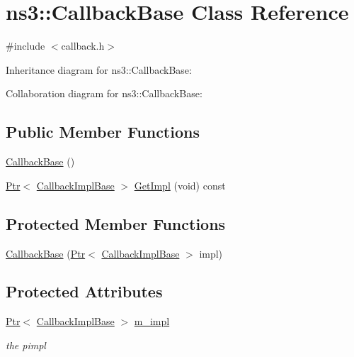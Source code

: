 \hypertarget{classns3_1_1CallbackBase}{}\section{ns3\+:\+:Callback\+Base Class Reference}
\label{classns3_1_1CallbackBase}


{\ttfamily \#include $<$callback.\+h$>$}



Inheritance diagram for ns3\+:\+:Callback\+Base\+:


Collaboration diagram for ns3\+:\+:Callback\+Base\+:
\subsection*{Public Member Functions}
\begin{DoxyCompactItemize}
\item 
\hyperlink{classns3_1_1CallbackBase_a6b56daf07aaf75faeaf954f2d476d9b9}{Callback\+Base} ()
\item 
\hyperlink{classns3_1_1Ptr}{Ptr}$<$ \hyperlink{classns3_1_1CallbackImplBase}{Callback\+Impl\+Base} $>$ \hyperlink{classns3_1_1CallbackBase_a89fd0e6ca954ae0d73382bff2fbfc20b}{Get\+Impl} (void) const 
\end{DoxyCompactItemize}
\subsection*{Protected Member Functions}
\begin{DoxyCompactItemize}
\item 
\hyperlink{classns3_1_1CallbackBase_a15ee9b49bf0815bbbd6101c44b3189fb}{Callback\+Base} (\hyperlink{classns3_1_1Ptr}{Ptr}$<$ \hyperlink{classns3_1_1CallbackImplBase}{Callback\+Impl\+Base} $>$ impl)
\end{DoxyCompactItemize}
\subsection*{Protected Attributes}
\begin{DoxyCompactItemize}
\item 
\hyperlink{classns3_1_1Ptr}{Ptr}$<$ \hyperlink{classns3_1_1CallbackImplBase}{Callback\+Impl\+Base} $>$ \hyperlink{classns3_1_1CallbackBase_a72d78e831d738f9d12ff357a1b0186de}{m\+\_\+impl}
\begin{DoxyCompactList}\small\item\em the pimpl \end{DoxyCompactList}\end{DoxyCompactItemize}


